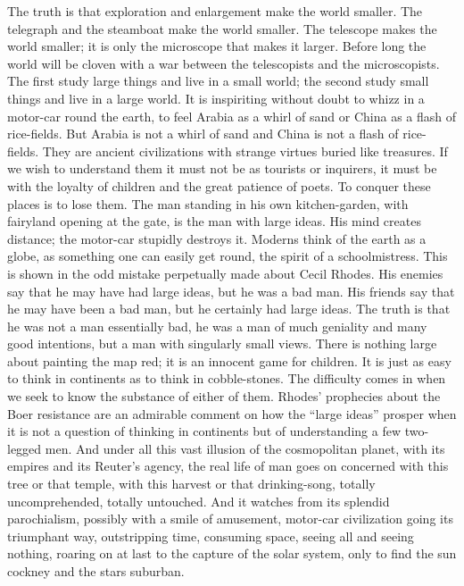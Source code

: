 The truth is that exploration and enlargement make the world smaller. The telegraph and the steamboat make the world smaller. The telescope makes the world smaller; it is only the microscope that makes it larger. Before long the world will be cloven with a war between the telescopists and the microscopists. The first study large things and live in a small world; the second study small things and live in a large world. It is inspiriting without doubt to whizz in a motor-car round the earth, to feel Arabia as a whirl of sand or China as a flash of rice-fields. But Arabia is not a whirl of sand and China is not a flash of rice-fields. They are ancient civilizations with strange virtues buried like treasures. If we wish to understand them it must not be as tourists or inquirers, it must be with the loyalty of children and the great patience of poets. To conquer these places is to lose them. The man standing in his own kitchen-garden, with fairyland opening at the gate, is the man with large ideas. His mind creates distance; the motor-car stupidly destroys it. Moderns think of the earth as a globe, as something one can easily get round, the spirit of a schoolmistress. This is shown in the odd mistake perpetually made about Cecil Rhodes. His enemies say that he may have had large ideas, but he was a bad man. His friends say that he may have been a bad man, but he certainly had large ideas. The truth is that he was not a man essentially bad, he was a man of much geniality and many good intentions, but a man with singularly small views. There is nothing large about painting the map red; it is an innocent game for children. It is just as easy to think in continents as to think in cobble-stones. The difficulty comes in when we seek to know the substance of either of them. Rhodes’ prophecies about the Boer resistance are an admirable comment on how the “large ideas” prosper when it is not a question of thinking in continents but of understanding a few two-legged men. And under all this vast illusion of the cosmopolitan planet, with its empires and its Reuter’s agency, the real life of man goes on concerned with this tree or that temple, with this harvest or that drinking-song, totally uncomprehended, totally untouched. And it watches from its splendid parochialism, possibly with a smile of amusement, motor-car civilization going its triumphant way, outstripping time, consuming space, seeing all and seeing nothing, roaring on at last to the capture of the solar system, only to find the sun cockney and the stars suburban.


